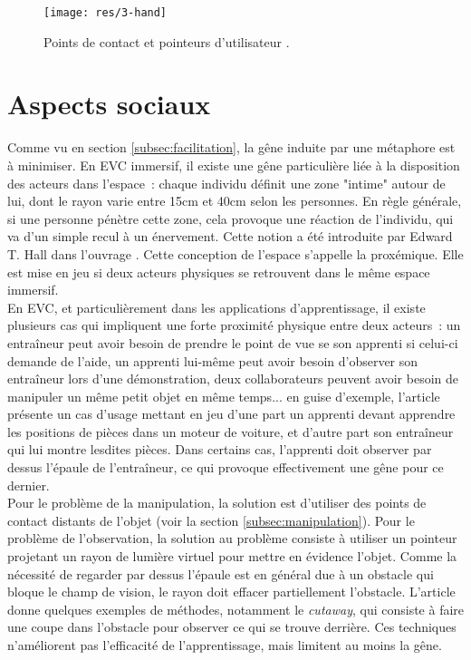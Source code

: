 \documentclass[11pt]{article}
\begin{document}
\begin{figure}
\centering
\texttt{[image: res/3-hand]}
\caption{\label{fig:3-hand}Points de contact et pointeurs d'utilisateur \cite{3-hand}.}
\end{figure}

\section{Aspects sociaux}
\label{sec:social}

Comme vu en section \ref{subsec:facilitation}, la gêne induite par une métaphore est à minimiser. En EVC immersif, il existe une gêne particulière liée à la disposition des acteurs dans l'espace~: chaque individu définit une zone "intime" autour de lui, dont le rayon varie entre 15cm et 40cm selon les personnes. En règle générale, si une personne pénètre cette zone, cela provoque une réaction de l'individu, qui va d'un simple recul à un énervement. Cette notion a été introduite par Edward T. Hall dans l'ouvrage \cite{proxemics}. Cette conception de l'espace s'appelle la proxémique. Elle est mise en jeu si deux acteurs physiques se retrouvent dans le même espace immersif.
\\

En EVC, et particulièrement dans les applications d'apprentissage, il existe plusieurs cas qui impliquent une forte proximité physique entre deux acteurs~: un entraîneur peut avoir besoin de prendre le point de vue se son apprenti si celui-ci demande de l'aide, un apprenti lui-même peut avoir besoin d'observer son entraîneur lors d'une démonstration, deux collaborateurs peuvent avoir besoin de manipuler un même petit objet en même temps... en guise d'exemple, l'article \cite{show-through} présente un cas d'usage mettant en jeu d'une part un apprenti devant apprendre les positions de pièces dans un moteur de voiture, et d'autre part son entraîneur qui lui montre lesdites pièces. Dans certains cas, l'apprenti doit observer par dessus l'épaule de l'entraîneur, ce qui provoque effectivement une gêne pour ce dernier.
\\

Pour le problème de la manipulation, la solution est d'utiliser des points de contact distants de l'objet (voir la section \ref{subsec:manipulation}). Pour le problème de l'observation, la solution au problème consiste à utiliser un pointeur projetant un rayon de lumière virtuel pour mettre en évidence l'objet. Comme la nécessité de regarder par dessus l'épaule est en général due à un obstacle qui bloque le champ de vision, le rayon doit effacer partiellement l'obstacle. L'article \cite{cutaway} donne quelques exemples de méthodes, notamment le \textit{cutaway}, qui consiste à faire une coupe dans l'obstacle pour observer ce qui se trouve derrière. Ces techniques n'améliorent pas l'efficacité de l'apprentissage, mais limitent au moins la gêne.
\end{document}
